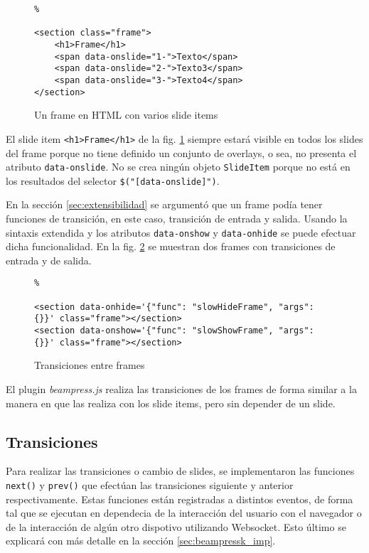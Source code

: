 			\begin{figure}[htb]%
				\begin{lstlisting}%

<section class="frame">
	<h1>Frame</h1>
	<span data-onslide="1-">Texto</span>
	<span data-onslide="2-">Texto3</span>
	<span data-onslide="3-">Texto4</span>
</section>
				\end{lstlisting}
				\caption{Un frame en HTML con varios slide items}
				\label{fig:frame_html_slides}
			\end{figure}

			El slide item \texttt{<h1>Frame</h1>} de la fig. \ref{fig:frame_html_slides} siempre estará visible en todos los slides del frame porque no tiene definido un conjunto de overlays, o sea, no presenta el atributo \texttt{data-onslide}. No se crea ningún objeto \texttt{SlideItem} porque no está en los resultados del selector \texttt{\$("[data-onslide]")}.


			En la sección \ref{sec:extensibilidad} se argumentó que un frame podía tener funciones de transición, en este caso, transición de entrada y salida. Usando la sintaxis extendida y los atributos \texttt{data-onshow} y \texttt{data-onhide} se puede efectuar dicha funcionalidad. En la fig. \ref{fig:frames_transitions} se muestran dos frames con transiciones de entrada y de salida.


		\begin{figure}[htb]%
			\begin{lstlisting}%

<section data-onhide='{"func": "slowHideFrame", "args": {}}' class="frame"></section>
<section data-onshow='{"func": "slowShowFrame", "args": {}}' class="frame"></section>
			\end{lstlisting}
		\caption{Transiciones entre frames}
		\label{fig:frames_transitions}
		\end{figure}	

		El plugin \textit{beampress.js} realiza las transiciones de los frames de forma similar a la manera en que las realiza con los slide items, pero sin depender de un slide.

		\subsection{Transiciones} %
		\label{sub:transiciones}
			Para realizar las transiciones o cambio de slides, se implementaron las funciones \texttt{next()} y \texttt{prev()} que efectúan las transiciones siguiente y anterior respectivamente. Estas funciones están registradas a distintos eventos, de forma tal que se ejecutan en dependecia de la interacción del usuario con el navegador o de la interacción de algún otro dispotivo utilizando Websocket. Esto último se explicará con más detalle en la sección \ref{sec:beampressk_imp}.

